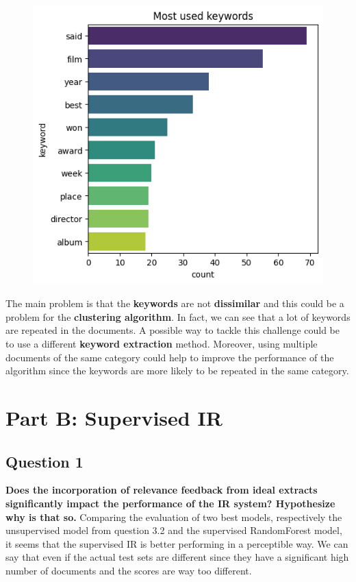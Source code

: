 \begin{figure}[H]
\begin{minipage}{.5\textwidth}
    \includegraphics[width=1\linewidth]{images/keyword_distribution_ranks.png}
    \label{fig:question4_2}
  \end{minipage}
\end{figure}

The main problem is that the \textbf{keywords} are not \textbf{dissimilar} and
this could be a problem for the \textbf{clustering algorithm}. In fact, we can
see that a lot of keywords are repeated in the documents. A possible way to
tackle this challenge could be to use a different \textbf{keyword extraction} method. Moreover, using multiple documents of the same
category could help to improve the performance of the algorithm since the
keywords are more likely to be repeated in the same category.

\section*{Part B: Supervised IR}
\subsection{Question 1}
\textbf{ Does the incorporation of relevance feedback from ideal extracts significantly impact the performance of the IR system? Hypothesize why is that so.}
Comparing the evaluation of two best models, respectively the unsupervised model from question 3.2 and the supervised RandomForest model, it seems that the supervised IR is better performing in a perceptible way. We can say that even if the actual test sets are different since they have a significant high number of documents and the scores are way too different.



